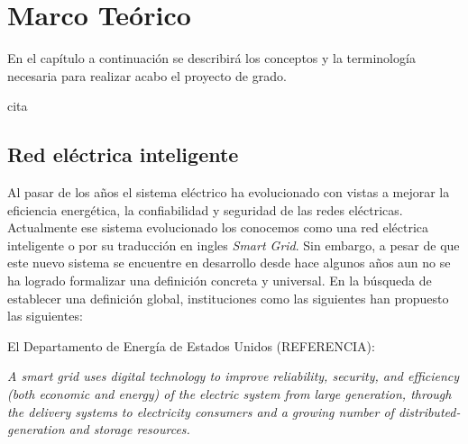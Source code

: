 \chapter{Marco Teórico}\label{sec:Marco_Teorico}
\thispagestyle{empty}
\newcommand{\subsubsubsection}[1]{\paragraph{#1}\mbox{}\\}
\setcounter{secnumdepth}{4}
\setcounter{tocdepth}{4}

\newcommand{\subsubsubsubsection}[1]{\paragraph{#1}\mbox{}\\}
\setcounter{secnumdepth}{5}
\setcounter{tocdepth}{5}

\begingroup
{}
\small

\endgroup

\par En el capítulo a continuación se describirá los conceptos y la terminología necesaria para realizar acabo el proyecto de grado.
\par cita \cite{}
\section{Red eléctrica inteligente}
  \par Al pasar de los años el sistema eléctrico ha evolucionado con vistas a mejorar la eficiencia energética, la confiabilidad y seguridad de las redes eléctricas. Actualmente ese sistema evolucionado los conocemos como una red eléctrica inteligente o por su traducción en ingles \textit{Smart Grid}. Sin embargo, a pesar de que este nuevo sistema se encuentre en desarrollo desde hace algunos años aun no se ha logrado formalizar una definición concreta y universal. En la búsqueda de establecer una definición global, instituciones como las siguientes han propuesto las siguientes:

  \par El Departamento de Energía de Estados Unidos (REFERENCIA):
  \par \textit{A smart grid uses digital technology to improve reliability, security, and efficiency (both economic and energy) of the electric system from large generation, through the delivery systems to electricity consumers and a growing number of distributed-generation and storage resources.}

